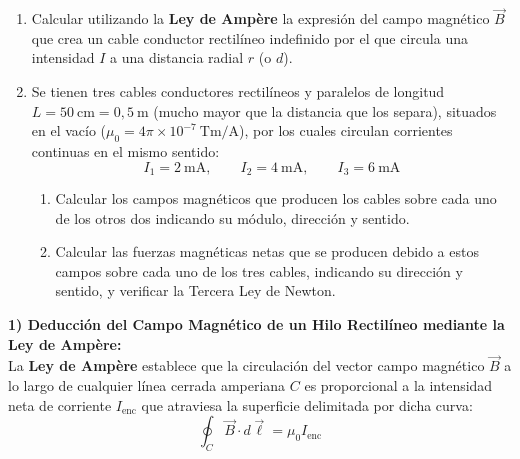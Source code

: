 \begin{ejercicio}
\begin{enumerate}[label=\arabic*)]
    \item Calcular utilizando la \textbf{Ley de Ampère} la expresión del campo magnético $\vec{B}$ que crea un cable conductor rectilíneo indefinido por el que circula una intensidad $I$ a una distancia radial $r$ (o $d$).
    \item Se tienen tres cables conductores rectilíneos y paralelos de longitud $L = 50\ \si{\centi\meter} = 0{,}5\ \si{\meter}$ (mucho mayor que la distancia que los separa), situados en el vacío ($\mu_0 = 4\pi \times 10^{-7}\ \si{\tesla\meter\per\ampere}$), por los cuales circulan corrientes continuas en el mismo sentido:
    \begin{equation}
        I_1 = 2\ \si{\milli\ampere}, \qquad I_2 = 4\ \si{\milli\ampere}, \qquad I_3 = 6\ \si{\milli\ampere}
    \end{equation}
    \begin{enumerate}[label=\alph*)]
        \item Calcular los campos magnéticos que producen los cables sobre cada uno de los otros dos indicando su módulo, dirección y sentido.
        \item Calcular las fuerzas magnéticas netas que se producen debido a estos campos sobre cada uno de los tres cables, indicando su dirección y sentido, y verificar la Tercera Ley de Newton.
    \end{enumerate}
\end{enumerate}
\tcbline
\textbf{1) Deducción del Campo Magnético de un Hilo Rectilíneo mediante la Ley de Ampère:}\\[4pt]
La \textbf{Ley de Ampère} establece que la circulación del vector campo magnético $\vec{B}$ a lo largo de cualquier línea cerrada amperiana $C$ es proporcional a la intensidad neta de corriente $I_{\text{enc}}$ que atraviesa la superficie delimitada por dicha curva:
\begin{equation}
    \oint_C \vec{B} \cdot d\vec{\ell} = \mu_0 I_{\text{enc}}
\end{equation}

\begin{center}
\end{center}


\end{ejercicio}
